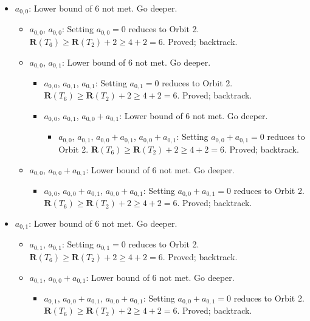 \documentclass[11pt]{article}
\begin{document}
\begin{itemize}
  \item $a_{0,0}$: Lower bound of 6 not met. Go deeper.
        \begin{itemize}
          \item $a_{0,0}$, $a_{0,0}$: Setting $a_{0,0}=0$ reduces to Orbit 2. $\mathbf{R}(T_6) \ge \mathbf{R}(T_2)+2 \ge 4+2=6$. Proved; backtrack.
          \item $a_{0,0}$, $a_{0,1}$: Lower bound of 6 not met. Go deeper.
                \begin{itemize}
                  \item $a_{0,0}$, $a_{0,1}$, $a_{0,1}$: Setting $a_{0,1}=0$ reduces to Orbit 2. $\mathbf{R}(T_6) \ge \mathbf{R}(T_2)+2 \ge 4+2=6$. Proved; backtrack.
                  \item $a_{0,0}$, $a_{0,1}$, $a_{0,0}+a_{0,1}$: Lower bound of 6 not met. Go deeper.
                        \begin{itemize}
                          \item $a_{0,0}$, $a_{0,1}$, $a_{0,0}+a_{0,1}$, $a_{0,0}+a_{0,1}$: Setting $a_{0,0}+a_{0,1}=0$ reduces to Orbit 2. $\mathbf{R}(T_6) \ge \mathbf{R}(T_2)+2 \ge 4+2=6$. Proved; backtrack.
                        \end{itemize}
                \end{itemize}
          \item $a_{0,0}$, $a_{0,0}+a_{0,1}$: Lower bound of 6 not met. Go deeper.
                \begin{itemize}
                  \item $a_{0,0}$, $a_{0,0}+a_{0,1}$, $a_{0,0}+a_{0,1}$: Setting $a_{0,0}+a_{0,1}=0$ reduces to Orbit 2. $\mathbf{R}(T_6) \ge \mathbf{R}(T_2)+2 \ge 4+2=6$. Proved; backtrack.
                \end{itemize}
        \end{itemize}
  \item $a_{0,1}$: Lower bound of 6 not met. Go deeper.
        \begin{itemize}
          \item $a_{0,1}$, $a_{0,1}$: Setting $a_{0,1}=0$ reduces to Orbit 2. $\mathbf{R}(T_6) \ge \mathbf{R}(T_2)+2 \ge 4+2=6$. Proved; backtrack.
          \item $a_{0,1}$, $a_{0,0}+a_{0,1}$: Lower bound of 6 not met. Go deeper.
                \begin{itemize}
                  \item $a_{0,1}$, $a_{0,0}+a_{0,1}$, $a_{0,0}+a_{0,1}$: Setting $a_{0,0}+a_{0,1}=0$ reduces to Orbit 2. $\mathbf{R}(T_6) \ge \mathbf{R}(T_2)+2 \ge 4+2=6$. Proved; backtrack.

\end{itemize}
\end{itemize}
\end{itemize}
\end{document}
